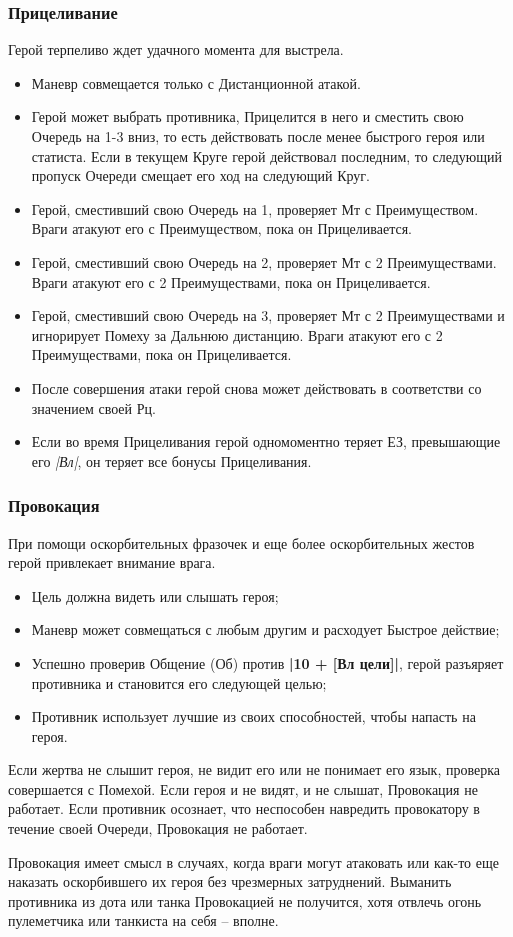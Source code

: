 \subsubsection{Прицеливание}
Герой терпеливо ждет удачного момента для выстрела.
\begin{itemize}
  \item Маневр совмещается только с Дистанционной атакой.
  \item Герой может выбрать противника, Прицелится в него и сместить свою Очередь на 1-3 вниз, то есть действовать после менее быстрого героя или статиста. Если в текущем Круге герой действовал последним, то следующий пропуск Очереди смещает его ход на следующий Круг.
  \item Герой, сместивший свою Очередь на 1, проверяет Мт с Преимуществом. Враги атакуют его с Преимуществом, пока он Прицеливается.
  \item Герой, сместивший свою Очередь на 2, проверяет Мт с 2 Преимуществами. Враги атакуют его с 2 Преимуществами, пока он Прицеливается.
  \item Герой, сместивший свою Очередь на 3, проверяет Мт с 2 Преимуществами и игнорирует Помеху за Дальнюю дистанцию. Враги атакуют его с 2 Преимуществами, пока он Прицеливается.
  \item После совершения атаки герой снова может действовать в соответстви со значением своей Рц.
  \item Если во время Прицеливания герой одномоментно теряет ЕЗ, превышающие его \textit{|Вл|}, он  теряет все бонусы Прицеливания. 
\end{itemize}

\subsubsection{Провокация}
При помощи оскорбительных фразочек и еще более оскорбительных жестов герой привлекает внимание врага.
\begin{itemize}
  \item Цель должна видеть или слышать героя;
  \item Маневр может совмещаться с любым другим и расходует Быстрое действие;
  \item Успешно проверив Общение (Об) против \textbf{|10 + [Вл цели]|}, герой разъяряет противника и становится его следующей целью;
  \item Противник использует лучшие из своих способностей, чтобы напасть на героя. 
\end{itemize}
Если жертва не слышит героя, не видит его или не понимает его язык, проверка совершается с Помехой. Если героя и не видят, и не слышат, Провокация не работает.
\newline Если противник осознает, что неспособен навредить провокатору в течение своей Очереди, Провокация не работает.
\begin{tcolorbox}
  Провокация имеет смысл в случаях, когда враги могут атаковать или как-то еще наказать оскорбившего их героя без чрезмерных затруднений. Выманить противника из дота или танка Провокацией не получится, хотя отвлечь огонь пулеметчика или танкиста на себя – вполне.
\end{tcolorbox}

